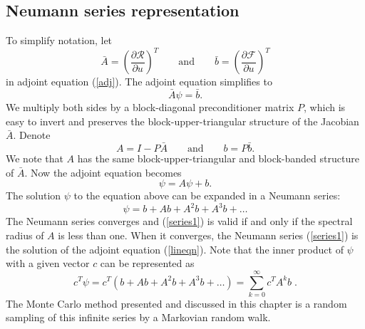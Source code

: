     \subsection{Neumann series representation}
        To simplify notation, let
        \[ \bar{A} = \left( \frac{\partial \mathcal{R}}{\partial u} \right)^T
            \qquad \mbox{and} \qquad
            \bar{b} = \left( \frac{\partial \mathcal{F}}{\partial u} \right)^T
        \]
        in adjoint equation (\ref{adj}).  The adjoint equation simplifies to
        \[ \bar{A} \psi = \bar{b} . \] We multiply both sides by a
        block-diagonal preconditioner matrix $P$, which is easy to invert
        and preserves the block-upper-triangular structure of the Jacobian
        $\bar{A}$. Denote
        \begin{equation}
            A = I - P \bar{A} \qquad \mbox{and} \qquad b = P \bar{b} .
            \label{precond}
        \end{equation}
        We note that $A$ has the same block-upper-triangular and block-banded
        structure of $\bar{A}$.  Now the adjoint equation becomes
        \begin{equation}
            \psi = A \psi + b .
            \label{lineqn}
        \end{equation}
        The solution $\psi$ to the equation above can be expanded in a
        Neumann series:
        \begin{equation}
            \psi = b + A b + A^2 b + A^3 b + \ldots
            \label{series1}
        \end{equation}
        The Neumann series converges and (\ref{series1}) is valid if and only
        if the spectral radius of $A$ is less than one. When it converges,
        the Neumann series (\ref{series1}) is the solution of the adjoint
        equation (\ref{lineqn}). Note that the inner product of $\psi$
        with a given vector $c$ can be represented as
        \begin{equation}
            c^T \psi = c^T ( b + A b + A^2 b + A^3 b + \ldots )
                     = \sum_{k=0}^\infty c^T A^k b \;.
            \label{series}
        \end{equation}
        The Monte Carlo method presented and discussed
        in this chapter is a random sampling of this
        infinite series by a Markovian random walk.
    


